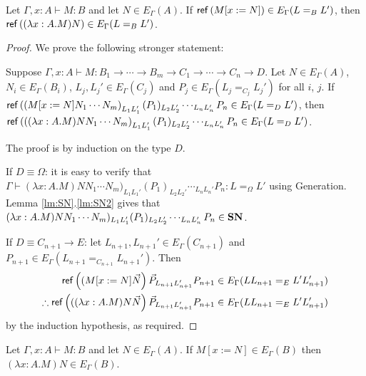 \begin{lm}
\label{lm:wte1}
Let $\Gamma, x : A \vdash M : B$ and let $N \in E_\Gamma(A)$.  If $\mathsf{ref} \left( {M[x:=N]} \right) \in E_\Gamma(L =_B L')$, then
$\mathsf{ref} \left( {(\lambda x:A.M)N} \right) \in E_\Gamma(L =_B L')$.
\end{lm}

\begin{proof}
We prove the following stronger statement:

Suppose $\Gamma, x : A \vdash M : B_1 \rightarrow \cdots \rightarrow B_m \rightarrow C_1 \rightarrow \cdots \rightarrow C_n \rightarrow D$.
Let $N \in E_\Gamma(A)$, $N_i \in E_\Gamma(B_i)$, $L_j, L_j' \in E_\Gamma(C_j)$ and $P_j \in E_\Gamma(L_j =_{C_j} L_j')$ for all $i$, $j$.
If $\mathsf{ref} \left( {(M[x:=N] N_1 \cdots N_m} \right)_{L_1 L_1'} (P_1)_{L_2 L_2'} \cdots_{L_n L_n'} P_n \in E_\Gamma(L =_{D} L')$,
then $\mathsf{ref} \left( {((\lambda x:A.M)N N_1 \cdots N_m} \right)_{L_1 L_1'} (P_1)_{L_2 L_2'} \cdots_{L_n L_n'} P_n \in E_\Gamma(L =_{D} L')$.

The proof is by induction on the type $D$.

If $D \equiv \Omega$: it is easy to verify that \\
$\Gamma \vdash (\lambda x:A.M)N N_1 \cdots N_m)_{L_1 L_1'} (P_1)_{L_2 L_2'} \cdots_{L_n L_n'} P_n : L =_{\Omega} L'$ using
Generation.  Lemma \ref{lm:SN}.\ref{lm:SN2} gives that $(\lambda x:A.M)N N_1 \cdots N_m)_{L_1 L_1'} (P_1)_{L_2 L_2'} \cdots_{L_n L_n'} P_n \in \mathbf{SN}$.

If $D \equiv C_{n+1} \rightarrow E$: let $L_{n+1}, L_{n+1}' \in E_\Gamma(C_{n+1})$ and $P_{n+1} \in E_{\Gamma}(L_{n+1} =_{C_{n+1}} L_{n+1}')$.  Then
\begin{align*}
\mathsf{ref} \left( {(M[x:=N] \vec{N}} \right) \vec{P}_{L_{n+1} L_{n+1}'} P_{n+1} & \in E_\Gamma(L L_{n+1} =_{E} L' L_{n+1}') \\
\therefore \mathsf{ref} \left( {((\lambda x:A.M)N \vec{N}} \right) \vec{P}_{L_{n+1} L_{n+1}'} P_{n+1} & \in E_\Gamma(L L_{n+1} =_{E} L' L_{n+1}')
\end{align*}
by the induction hypothesis, as required.
\end{proof}

\begin{lm}
\label{lm:wte2}
Let $\Gamma, x : A \vdash M : B$ and let $N \in E_\Gamma(A)$.  If $M[x:=N] \in E_\Gamma(B)$ then $(\lambda x:A.M)N \in E_\Gamma(B)$.
\end{lm}

